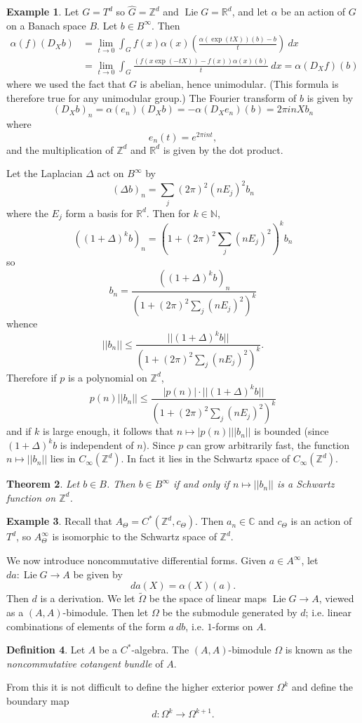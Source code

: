\documentclass[12pt]{report}
\newcommand{\NN}{\mathbb{N}}
\newcommand{\ZZ}{\mathbb{Z}}
\newcommand{\RR}{\mathbb{R}}
\newcommand{\CC}{\mathbb{C}}
\newcommand{\Lie}{\operatorname{Lie}}
\newcommand{\dfn}[1]{\emph{#1}\index{#1}}
\newtheorem{theorem}{Theorem}[chapter]
\theoremstyle{definition}
\newtheorem{definition}[theorem]{Definition}
\newtheorem{example}[theorem]{Example}
\begin{document}
\begin{example}
    Let $G = T^d$ so $\hat G = \ZZ^d$ and $\Lie G = \RR^d$, and let $\alpha$ be an action of $G$ on a Banach space $B$. Let $b \in B^\infty$. Then
\begin{align*}
    \alpha(f)(D_Xb) &= \lim_{t \to 0} \int_G f(x) \alpha(x)\left(\frac{\alpha(\exp(tX))(b) - b}{t}\right) ~dx\\
        &= \lim_{t \to 0} \int_G \frac{(f(x \exp(-tX)) - f(x))\alpha(x)(b)}{t} ~dx = \alpha(D_Xf)(b)
\end{align*}
    where we used the fact that $G$ is abelian, hence unimodular. (This formula is therefore true for any unimodular group.) The Fourier transform of $b$ is given by
    $$(D_Xb)_n = \alpha(e_n)(D_Xb) = -\alpha(D_Xe_n)(b) = 2\pi inXb_n$$
    where
    $$e_n(t) = e^{2\pi int},$$
    and the multiplication of $\ZZ^d$ and $\RR^d$ is given by the dot product.

    Let the Laplacian $\Delta$ act on $B^\infty$ by
    $$(\Delta b)_n = \sum_j (2\pi)^2 (nE_j)^2 b_n$$
    where the $E_j$ form a basis for $\RR^d$. Then for $k \in \NN$,
    $$((1 + \Delta)^k b)_n = \left(1 + (2\pi)^2 \sum_j (nE_j)^2\right)^k b_n$$
    so
    $$b_n = \frac{((1 + \Delta)^kb)_n}{(1 + (2\pi)^2\sum_j(nE_j)^2)^k}$$
    whence
    $$||b_n|| \leq \frac{||(1+ \Delta)^kb||}{(1 + (2\pi)^2\sum_j (nE_j)^2)^k}.$$
    Therefore if $p$ is a polynomial on $\ZZ^d$,
    $$p(n)||b_n|| \leq \frac{|p(n)|\cdot ||(1 + \Delta)^kb||}{(1 + (2\pi)^2 \sum_j (nE_j)^2)^k}$$
    and if $k$ is large enough, it follows that $n \mapsto |p(n)|||b_n||$ is bounded (since $(1 + \Delta)^kb$ is independent of $n$). Since $p$ can grow arbitrarily fast, the function $n \mapsto ||b_n||$ lies in $C_\infty(\ZZ^d)$. In fact it lies in the Schwartz space of $C_\infty(\ZZ^d)$.
\end{example}
\begin{theorem}
    Let $b \in B$. Then $b \in B^\infty$ if and only if $n \mapsto ||b_n||$ is a Schwartz function on $\ZZ^d$.
\end{theorem}
\begin{example}
    Recall that $A_\Theta = C^*(\ZZ^d, c_\Theta)$. Then $a_n \in \CC$ and $c_\Theta$ is an action of $T^d$, so $A_\Theta^\infty$ is isomorphic to the Schwartz space of $\ZZ^d$.
\end{example}
    We now introduce noncommutative differential forms. Given $a \in A^\infty$, let $da: \Lie G \to A$ be given by
    $$da(X) = \alpha(X)(a).$$
    Then $d$ is a derivation. We let $\tilde \Omega$ be the space of linear maps $\Lie G \to A$, viewed as a $(A, A)$-bimodule. Then let $\Omega$ be the submodule generated by $d$; i.e. linear combinations of elements of the form $a~db$, i.e. $1$-forms on $A$.
\begin{definition}
    Let $A$ be a $C^*$-algebra. The $(A,A)$-bimodule $\Omega$ is known as the \dfn{noncommutative cotangent bundle} of $A$.
\end{definition}
    From this it is not difficult to define the higher exterior power $\Omega^k$ and define the boundary map
    $$d: \Omega^k \to \Omega^{k+1}.$$
    
\end{document}

